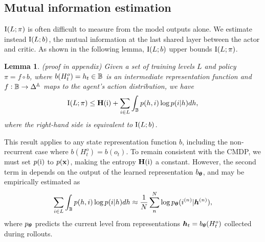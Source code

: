 \documentclass{article}
\theoremstyle{plain}
\newtheorem{lemma}[theorem]{Lemma}
\theoremstyle{definition}
\theoremstyle{remark}
\begin{document}
\subsection{Mutual information estimation}
$\text{I}(L;\pi)$ is often difficult to measure from the model outputs alone. We estimate instead $\text{I}(L;b)$, the mutual information at the last shared layer between the actor and critic. As shown in the following lemma, $\text{I}(L;b)$ upper bounds $\text{I}(L;\pi)$.
%
\begin{lemma} \label{lem:mi_fixed_L}
    (proof in appendix) Given a set of training levels $L$ and policy $\pi = f \circ b$, where $b(H^o_t) = h_t \in {\mathbb{B}}$ is an intermediate representation function and $f : {\mathbb{B}} \rightarrow \Delta^{\mathbb{A}}$ maps to the agent's action distribution, we have
    \begin{align} \label{eq:lemma_result}
        \text{I}(L;\pi) \leq \mathbf{H}({\textnormal{i}}) + \sum_{i\in L} \int_{{\mathbb{B}}} p(h, i) \log p(i|h)dh,
    \end{align}
    where the right-hand side is equivalent to $\text{I}(L;b)$.
\end{lemma}
This result applies to any state representation function $b$, including the non-recurrent case where $b(H^o_t) = b(o_t)$. To remain consistent with the CMDP, we must set $p({\textnormal{i}})$ to $p({\mathbf{x}})$, making the entropy $\mathbf{H}({\textnormal{i}})$ a constant. However, the second term in  %
depends on the output of the learned representation $b_{\bm{\theta}}$, and may be empirically estimated as
%
\begin{equation} \label{eq:mi_empirical_approx}
   \sum_{i\in L} \int_{{\mathbb{B}}} p(h, i) \log p(i|h)dh \approx \frac{1}{N} \sum^{N}_{n} \log p_{\bm{\theta}}(i^{(n)}|{\bm{h}}^{(n)}),
\end{equation}
where $p_{\bm{\theta}}$ predicts the current level from representations ${\bm{h}}_t = b_{\bm{\theta}} (H_t^o)$ collected during rollouts.
\end{document}
